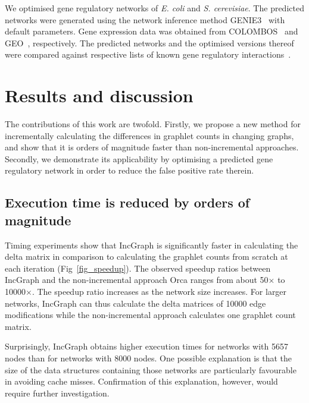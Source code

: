 We optimised gene regulatory networks of \textit{E. coli} and \textit{S. cerevisiae}. The predicted networks were generated using the network inference method GENIE3~\cite{Vananh2010} with default parameters. Gene expression data was obtained from COLOMBOS~\cite{Moretto2016} and GEO~\cite{Edgar2002}, respectively. The predicted networks and the optimised versions thereof were compared against respective lists of known gene regulatory interactions~\cite{Gama-Castro2016,Ma2014}.

\section*{Results and discussion}
The contributions of this work are twofold. Firstly, we propose a new method for incrementally calculating the differences in graphlet counts in changing graphs, and show that it is orders of magnitude faster than non-incremental approaches. Secondly, we demonstrate its applicability by optimising a predicted gene regulatory network in order to reduce the false positive rate therein.

\subsection*{Execution time is reduced by orders of magnitude}
Timing experiments show that IncGraph is significantly faster in calculating the delta matrix in comparison to calculating the graphlet counts from scratch at each iteration (Fig~\ref{fig_speedup}). The observed speedup ratios between IncGraph and the non-incremental approach Orca ranges from about 50$\times$ to 10000$\times$. The speedup ratio increases as the network size increases. For larger networks, IncGraph can thus calculate the delta matrices of 10000 edge modifications while the non-incremental approach calculates one graphlet count matrix.

Surprisingly, IncGraph obtains higher execution times for networks with 5657 nodes than for networks with 8000 nodes. One possible explanation is that the size of the data structures containing those networks are particularly favourable in avoiding cache misses. Confirmation of this explanation, however, would require further investigation.



